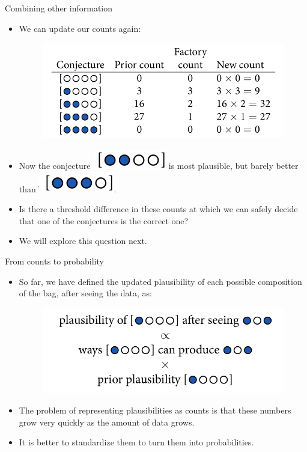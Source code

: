 \documentclass[handout]{beamer}
\begin{document}
\begin{frame}{Combining other information}
\scriptsize{
\begin{itemize}
 \item We can update our counts again:
\begin{figure}[h!]
	\centering
	\includegraphics[scale=0.33]{pics/marbles18.png}
\end{figure}
\item Now the conjecture \includegraphics[scale=0.3]{pics/marbles13.png} is most plausible, but barely better than \includegraphics[scale=0.3]{pics/marbles14.png}.
\item Is there a threshold difference in these counts at which we can safely decide that one of the conjectures is the correct one? 
\item We will explore this question next.
\end{itemize}
 } 
\end{frame}

\begin{frame}{From counts to probability}
\scriptsize{
\begin{itemize}
 \item  So far, we have defined the updated plausibility of each possible composition of the bag, after seeing the data, as:
 \begin{figure}[h!]
	\centering
	\includegraphics[scale=0.3]{pics/marbles19.png}
\end{figure}
\item The problem of representing plausibilities as counts is that these numbers grow very quickly  as  the amount of data grows. 
 \item It is better to standardize them to turn them into probabilities.
\end{itemize}
 } 
\end{frame}
\end{document}
